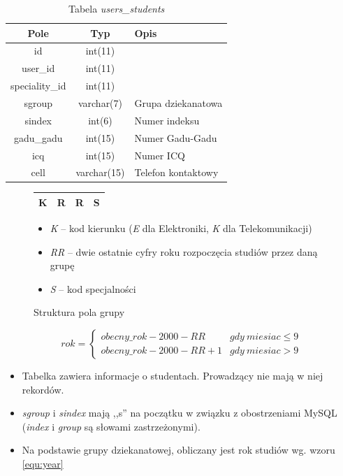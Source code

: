 \documentclass[a4paper,12pt,oneside]{report}
\begin{document}
\begin{table}[h]
  \centering
  \begin{tabular}{|c|c|l|}\hline
  Pole & Typ & Opis \\\hline
  id             & int(11)     & \\
  user\_id       & int(11)     & \\
  speciality\_id & int(11)     & \\
  sgroup         & varchar(7)  & Grupa dziekanatowa\\
  sindex         & int(6)      & Numer indeksu \\
  gadu\_gadu     & int(15)     & Numer Gadu-Gadu \\
  icq            & int(15)     & Numer ICQ \\
  cell           & varchar(15) & Telefon kontaktowy \\\hline

  \end{tabular}
  \caption{Tabela \emph{users\_students}\label{tab:users_students}}
\end{table}

\begin{figure}[h]
  \centering
  \begin{tabular}{|c|c|c|c|}\hline
  K & R & R & S\\\hline
  \end{tabular}
  \begin{itemize}
    \item \emph{K} -- kod kierunku (\emph{E} dla Elektroniki, \emph{K} dla Telekomunikacji)
    \item \emph{RR} -- dwie ostatnie cyfry roku rozpoczęcia studiów przez daną grupę
    \item \emph{S} -- kod specjalności
  \end{itemize}
  \caption{Struktura pola grupy\label{fig:group}}
\end{figure}
\begin{equation}
  rok = \left\{ \begin{array}{ll}
  obecny\_rok - 2000 - RR & gdy~miesiac \le 9\\
  obecny\_rok - 2000 - RR + 1 & gdy~miesiac > 9
  \end{array} \right.
  \label{equ:year}
\end{equation}
\begin{itemize}
  \item Tabelka zawiera informacje o studentach. Prowadzący nie mają w niej rekordów.
  \item \emph{sgroup} i \emph{sindex} mają ,,s'' na początku w związku z obostrzeniami MySQL (\emph{index} i \emph{group} są słowami zastrzeżonymi).
  \item Na podstawie grupy dziekanatowej, obliczany jest rok studiów wg. wzoru \ref{equ:year}
\end{itemize}
\end{document}
